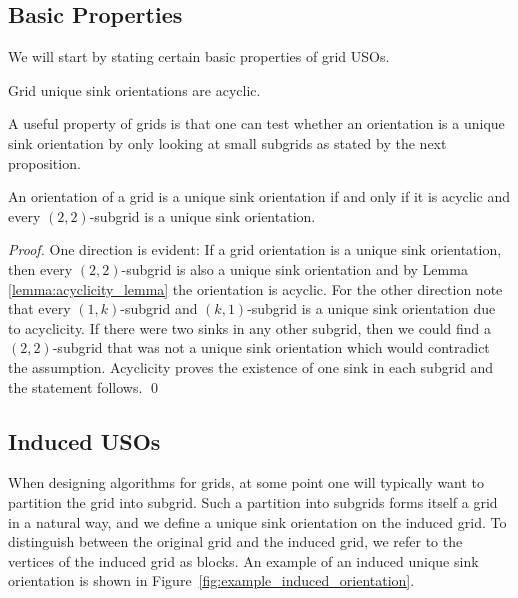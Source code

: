 \documentclass[runningheads,a4paper]{llncs}
\newcommand{\JN}[1]{\marginpar{\parbox{4cm}{{\small {\bf JN:} #1}}}} %
\begin{document}

\subsection{Basic Properties}

We will start by stating certain basic properties of grid USOs.

\begin{lemma}
\label{lemma:acyclicity_lemma}
 Grid unique sink orientations are acyclic.
\end{lemma}

A useful property of grids is that one can test whether an orientation is a unique sink orientation by only looking at small subgrids as stated by the next proposition.

\begin{proposition}
\label{prop:subgrid_uso_check}
 An orientation of a grid is a unique sink orientation if and only if it is acyclic and every $(2, 2)$-subgrid is a unique sink orientation.
\end{proposition}

\begin{proof}
 One direction is evident: If a grid orientation is a unique sink orientation, then every $(2,2)$-subgrid is also a unique sink orientation and by Lemma \ref{lemma:acyclicity_lemma} the orientation is acyclic. 
 For the other direction note that every $(1,k)$-subgrid and $(k,1)$-subgrid is a unique sink orientation due to acyclicity. 
 If there were two sinks in any other subgrid, then we could find a $(2,2)$-subgrid that was not a unique sink orientation which would contradict the assumption.
 Acyclicity proves the existence of one sink in each subgrid and the statement follows. \qed
\end{proof}

\subsection{Induced USOs}

When designing algorithms for grids, at some point one will typically want to
partition the grid into subgrid.
Such a partition into subgrids forms itself a grid in a natural way,
and we define a unique sink orientation on the induced grid.
To distinguish between the original grid and the induced grid, we refer to the vertices of the induced grid as blocks.
An example of an induced unique sink orientation is shown in Figure~\ref{fig:example_induced_orientation}.
\end{document}
